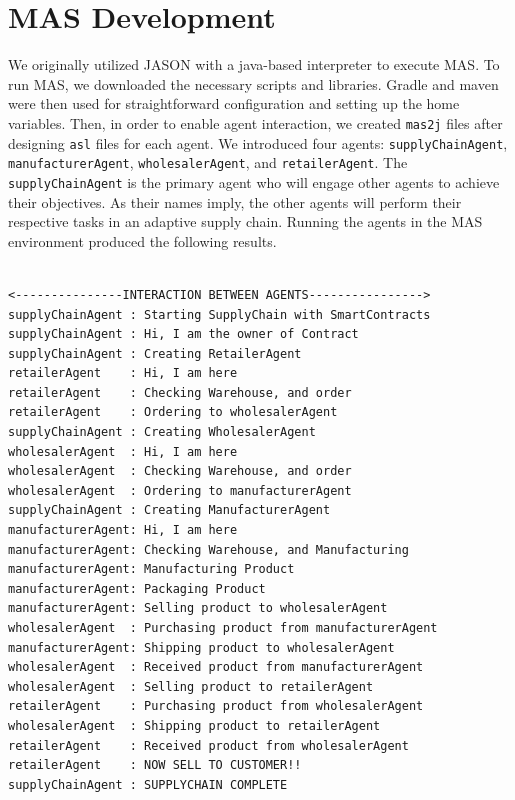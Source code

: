 \section{MAS Development}

We originally utilized JASON with a java-based interpreter to execute \ac{MAS}. To run \ac{MAS}, we downloaded the necessary scripts and libraries. Gradle and maven were then used for straightforward configuration and setting up the home variables. Then, in order to enable agent interaction, we created \texttt{mas2j} files after designing \texttt{asl} files for each agent. We introduced four agents: \texttt{supplyChainAgent}, \texttt{manufacturerAgent}, \texttt{wholesalerAgent}, and \texttt{retailerAgent}. The \texttt{supplyChainAgent} is the primary agent who will engage other agents to achieve their objectives. As their names imply, the other agents will perform their respective tasks in an adaptive supply chain. Running the agents in the \ac{MAS} environment produced the following results.

\vspace{.5cm}

\begin{lstlisting}[numbers=none, basicstyle=\ttfamily\tiny]

<---------------INTERACTION BETWEEN AGENTS---------------->
supplyChainAgent : Starting SupplyChain with SmartContracts
supplyChainAgent : Hi, I am the owner of Contract
supplyChainAgent : Creating RetailerAgent
retailerAgent    : Hi, I am here
retailerAgent    : Checking Warehouse, and order
retailerAgent    : Ordering to wholesalerAgent
supplyChainAgent : Creating WholesalerAgent
wholesalerAgent  : Hi, I am here
wholesalerAgent  : Checking Warehouse, and order
wholesalerAgent  : Ordering to manufacturerAgent
supplyChainAgent : Creating ManufacturerAgent
manufacturerAgent: Hi, I am here
manufacturerAgent: Checking Warehouse, and Manufacturing
manufacturerAgent: Manufacturing Product
manufacturerAgent: Packaging Product
manufacturerAgent: Selling product to wholesalerAgent
wholesalerAgent  : Purchasing product from manufacturerAgent
manufacturerAgent: Shipping product to wholesalerAgent
wholesalerAgent  : Received product from manufacturerAgent
wholesalerAgent  : Selling product to retailerAgent
retailerAgent    : Purchasing product from wholesalerAgent
wholesalerAgent  : Shipping product to retailerAgent
retailerAgent    : Received product from wholesalerAgent
retailerAgent    : NOW SELL TO CUSTOMER!!
supplyChainAgent : SUPPLYCHAIN COMPLETE
\end{lstlisting}

